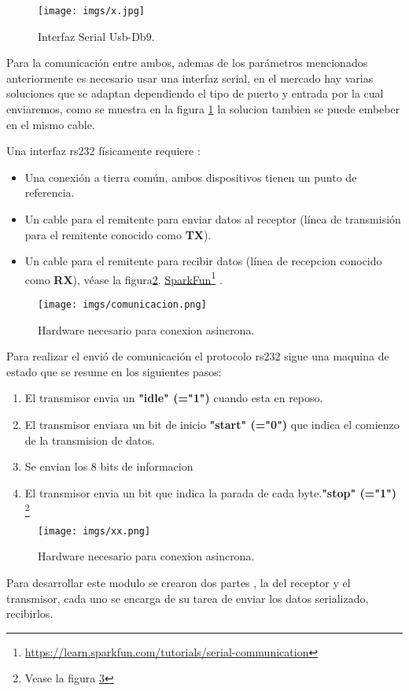 \documentclass[paper=a4, fontsize=12pt]{article}        %
\newcommand\fnurl[2]{%
\href{#2}{#1}\footnote{\url{#2}}%
}
\numberwithin{equation}{section}                        %
\numberwithin{table}{section}                           %
\begin{document}
\begin{figure}[H]
  \centering
     \texttt{[image: imgs/x.jpg]}
  \caption{Interfaz Serial Usb-Db9.}
    \label{fig:rsserial}
\end{figure}

Para la comunicación entre ambos, ademas de los parámetros mencionados anteriormente es necesario usar una interfaz serial, en el mercado hay varias soluciones que se adaptan dependiendo el tipo de puerto y entrada por la cual enviaremos, como se muestra en la figura \ref{fig:rsserial}  la solucion tambien se puede embeber en el mismo cable.

Una interfaz rs232 físicamente requiere :
\begin{itemize}
\item Una conexión a tierra común, ambos dispositivos tienen un punto de referencia.
\item Un cable para el remitente para enviar datos al receptor (línea de transmisión para el remitente conocido como \textbf{TX}).
\item Un cable para el remitente para recibir datos  (línea de recepcion conocido como \textbf{RX}), véase la figura\ref{fig:hard}. \fnurl{SparkFun}{https://learn.sparkfun.com/tutorials/serial-communication}.
\end{itemize}
\begin{figure}[H]
  \centering
     \texttt{[image: imgs/comunicacion.png]}
  \caption{Hardware necesario para conexion asincrona.}
    \label{fig:hard}
\end{figure}

Para realizar el envió de comunicación el protocolo rs232 sigue una maquina de estado que se resume en los siguientes pasos:
\begin{enumerate}
\item El transmisor envia un \textbf{"idle" (="1")}  cuando esta en reposo.
\item El transmisor enviara un bit de inicio \textbf{"start" (="0")} que indica el comienzo de la transmision de datos.
\item Se envian los 8 bits de informacion
\item El transmisor envia un bit que indica la parada de cada byte.\textbf{"stop" (="1")} \footnote{Vease la figura \ref{fig:senal}}
\end{enumerate}

\begin{figure}[H]
  \centering
     \texttt{[image: imgs/xx.png]}
  \caption{Hardware necesario para conexion asincrona.}
    \label{fig:senal}
\end{figure}
Para desarrollar este modulo se crearon dos partes , la del receptor y el transmisor, cada uno se encarga de su tarea de enviar los datos serializado, recibirlos. 
\end{document}
